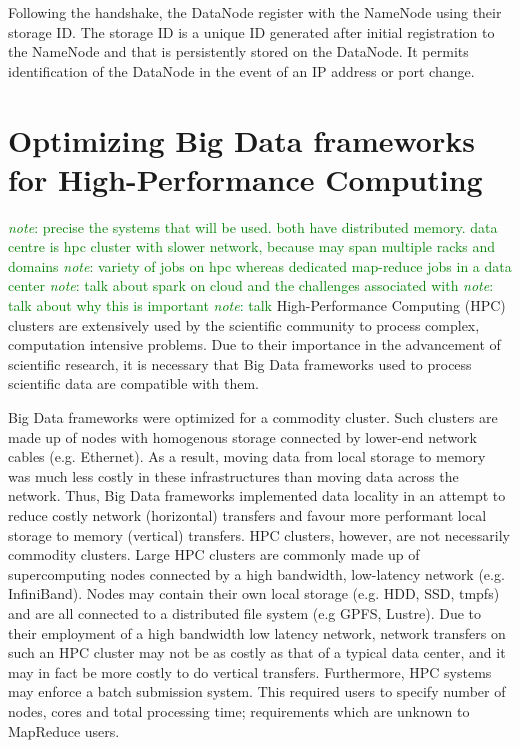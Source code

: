 \documentclass{report}
\newcommand{\note}[1]{\textcolor{green}{\textit{note}: #1}}
\begin{document}
        Following the handshake, the DataNode register with the 
        NameNode using their storage ID. The storage ID is a unique 
        ID generated after initial registration to the NameNode and 
        that is persistently stored on the DataNode. It permits
        identification of the DataNode in the event of an IP address 
        or port change. 
        

\chapter{Optimizing Big Data frameworks for High-Performance Computing}
	
    \note{precise the systems that will be used. both have distributed memory.
data centre is hpc cluster with slower network, because may span multiple racks
and domains} \note{variety of jobs on hpc whereas dedicated map-reduce jobs in a
data center} \note{talk about spark on cloud and the challenges associated with}
\note{talk about why this is important} \note{talk } High-Performance Computing
(HPC) clusters are extensively used by the scientific community to process
complex, computation intensive problems. Due to their importance in the
advancement of scientific research, it is necessary that Big Data frameworks
used to process scientific data are compatible with them. 
	
    Big Data frameworks were optimized for a commodity cluster.  Such clusters
are made up of nodes with homogenous storage connected by lower-end network
cables (e.g. Ethernet). As a result, moving data from local storage to memory
was much less costly in these infrastructures than moving data across the
network. Thus, Big Data frameworks implemented data locality in an attempt to
reduce costly network (horizontal) transfers and favour more performant local
storage to memory (vertical) transfers. HPC clusters, however, are not
necessarily commodity clusters. Large HPC clusters are commonly made up of
supercomputing nodes connected by a high bandwidth, low-latency network (e.g.
InfiniBand). Nodes may contain their own local storage (e.g. HDD, SSD, tmpfs)
and are all connected to a distributed file system (e.g GPFS, Lustre).  Due to
their employment of a high bandwidth low latency network, network transfers on
such an HPC cluster may not be as costly as that of a typical data center, and
it may in fact be more costly to do vertical transfers. Furthermore, HPC systems
may enforce a batch submission system. This required users to specify number of
nodes, cores and total processing time; requirements which are unknown to
MapReduce users.
	
\end{document}
